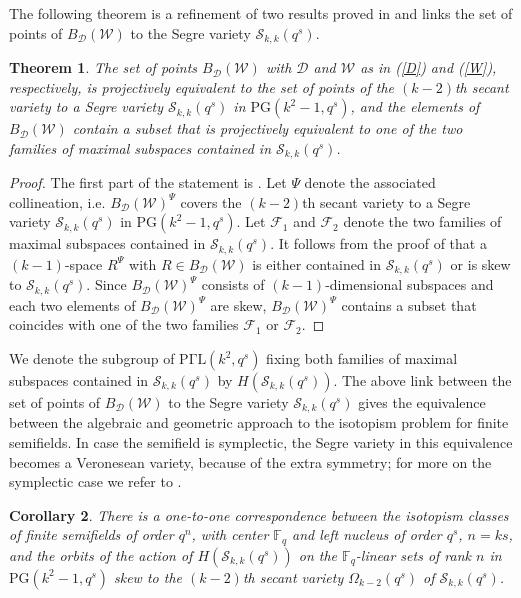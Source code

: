 \documentclass[12pt]{amsart}
\newtheorem{theorem}{\sc Theorem}[section]
\newtheorem{cor}[theorem]{\sc Corollary}
\def\F{\mathbb{F}}
\def\PG{\mathrm{PG}}
\def\W{\mathcal{W}}
\def\D{\mathcal{D}}
\begin{document}
The following theorem is a refinement of two results proved in \cite{Lavrauw2008} and links the set of points of $B_\D(\W)$ to the Segre variety ${\mathcal S}_{k,k}(q^s)$.
\begin{theorem}\label{thm:link}
The set of points $B_\D(\W)$ with $\D$ and $\W$ as in (\ref{D}) and (\ref{W}), respectively, is projectively equivalent to the set of points of the $(k-2)$th secant variety to a Segre variety ${\mathcal S}_{k,k}(q^s)$ in $\PG(k^2-1,q^s)$, and the elements of $B_\D(\W)$ contain a subset that is projectively equivalent to one of the two families of maximal subspaces contained in ${\mathcal S}_{k,k}(q^s)$.
\end{theorem}
\begin{proof}
The first part of the statement is \cite[Theorem 11]{Lavrauw2008}. Let $\Psi$ denote the associated collineation, i.e. $B_\D(\W)^\Psi$ covers the $(k-2)$th secant variety to a Segre variety ${\mathcal S}_{k,k}(q^s)$ in $\PG(k^2-1,q^s)$.
Let ${\mathcal{F}}_1$ and ${\mathcal{F}}_2$ denote the two families of maximal subspaces contained in ${\mathcal S}_{k,k}(q^s)$.
It follows from the proof of \cite[Corollary 12]{Lavrauw2008} that a $(k-1)$-space $R^\Psi$ with $R\in B_\D(\W)$ is either contained in ${\mathcal S}_{k,k}(q^s)$ or is skew to ${\mathcal S}_{k,k}(q^s)$. Since $B_\D(\W)^\Psi$ consists of $(k-1)$-dimensional subspaces and each two elements of $B_\D(\W)^\Psi$ are skew, $B_\D(\W)^\Psi$ contains a subset that coincides with one of the two families ${\mathcal{F}}_1$ or ${\mathcal{F}}_2$.
\end{proof}
We denote the subgroup of ${\mathrm{P\Gamma L}}(k^2,q^s)$ fixing both families of maximal subspaces contained in ${\mathcal S}_{k,k}(q^s)$ by $H({\mathcal S}_{k,k}(q^s))$. 
The above link between the set of points of $B_\D(\W)$ to the Segre variety ${\mathcal S}_{k,k}(q^s)$ gives the equivalence between the algebraic and geometric approach to the isotopism problem for finite semifields. In case the semifield is symplectic, the Segre variety in this equivalence becomes a Veronesean variety, because of the extra symmetry; for more on the symplectic case we refer to \cite{LuMaPoTr200*}.
\begin{cor}
There is a one-to-one correspondence between the isotopism classes of finite semifields of order $q^n$, with center $\F_q$ and left nucleus of order $q^s$, $n=ks$, and the orbits of the action of $H({\mathcal{S}}_{k,k}(q^s))$ on the $\F_q$-linear sets of rank $n$ in $\PG(k^2-1,q^s)$ skew to the $(k-2)$th secant variety $\Omega_{k-2}(q^s)$ of ${\mathcal S}_{k,k}(q^s)$.
\end{cor}
\end{document}
